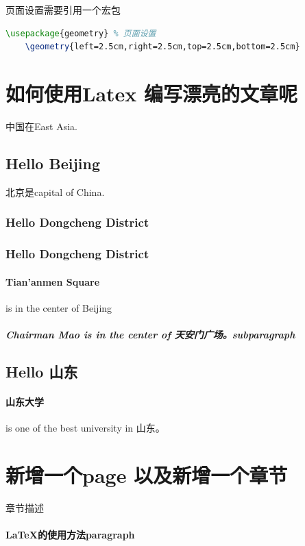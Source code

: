 \documentclass[UTF8]{ctexart}
\begin{document}
页面设置需要引用一个宏包

\begin{lstlisting}[language=tex]
    \usepackage{geometry} % 页面设置
    \geometry{left=2.5cm,right=2.5cm,top=2.5cm,bottom=2.5cm}
\end{lstlisting}

\section{如何使用Latex 编写漂亮的文章呢}
中国在East Asia.

\subsection{Hello Beijing}
北京是capital of China.
\subsubsection{Hello Dongcheng District}
\subsubsection{Hello Dongcheng District}

\paragraph{Tian'anmen Square}

is in the center of Beijing
\subparagraph{Chairman Mao    is in the center of 天安门广场。subparagraph}



\subsection{Hello 山东}
\paragraph{山东大学} is one of the best university in 山东。


\newpage

\section{新增一个page 以及新增一个章节}
章节描述
\paragraph{\LaTeX{}的使用方法paragraph}
\end{document}
